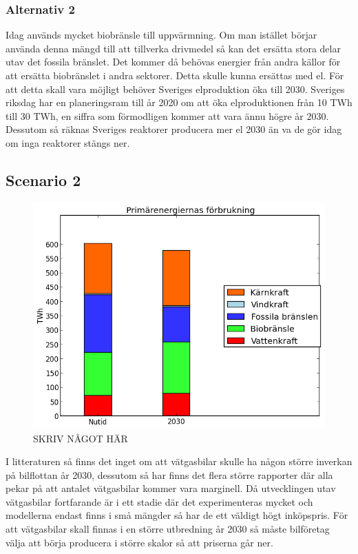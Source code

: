 \documentclass[a4paper,11pt,fleqn, titlepage]{article}
\begin{document}
\subsubsection{Alternativ 2}

Idag används mycket biobränsle till uppvärmning. Om man istället börjar använda denna mängd till att tillverka drivmedel så kan det ersätta stora delar utav det fossila bränslet. Det kommer då behövas energier från andra källor för att ersätta biobränslet i andra sektorer. Detta skulle kunna ersättas med el. För att detta skall vara möjligt behöver Sveriges elproduktion öka till 2030. Sveriges riksdag har en planeringsram till år 2020 om att öka elproduktionen från 10 TWh till 30 TWh, en siffra som förmodligen kommer att vara ännu högre år 2030. Dessutom så räknas Sveriges reaktorer producera mer el 2030 än va de gör idag om inga reaktorer stängs ner.


\subsection{Scenario 2}
\begin{figure}[h!]
       \centering
       \includegraphics[scale=0.7]{scen2energidiagram.png}
       \caption{SKRIV NÅGOT HÄR}
       \label{fig:scen2energydiagram}
\end{figure}
I litteraturen så finns det inget om att vätgasbilar skulle ha någon större inverkan på bilflottan år 2030, dessutom så har finns det flera större rapporter där alla pekar på att antalet vätgasbilar kommer vara marginell.
Då utvecklingen utav vätgasbilar fortfarande är i ett stadie där det experimenteras mycket och modellerna endast finns i små mängder så har de ett väldigt högt inköpspris. För att vätgasbilar skall finnas i en större utbredning år 2030 så måste bilföretag välja att börja producera i större skalor så att priserna går ner.
\end{document}
